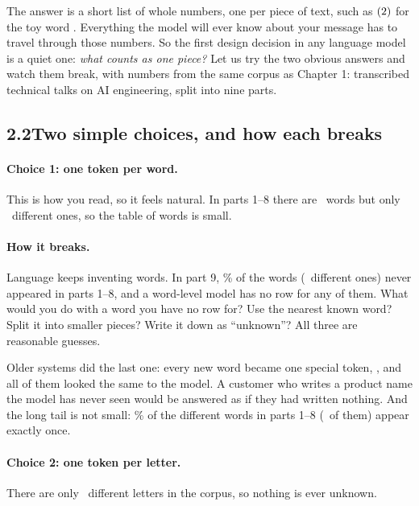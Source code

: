 The answer is a short list of whole numbers, one per piece of text, such as $(2)$ for the
toy word . Everything the model will ever know about your message has to travel through those
numbers. So the first design decision in any language model is a quiet one: \emph{what counts as one
piece?} Let us try the two obvious answers and watch them break, with numbers from the same corpus as
Chapter 1: transcribed technical talks on AI engineering, split into nine parts.


\subsection*{2.2\quad Two simple choices, and how each breaks}

\paragraph{Choice 1: one token per word.} This is how you read, so it feels natural. In parts 1--8 there
are \cTrainWords\ words but only \nTwoWordVocab\ different ones, so the table of words is small.

\paragraph{How it breaks.} Language keeps inventing words. In part 9, \nTwoUnseenWordPct\% of the
words (\nTwoUnseenTypes\ different ones) never appeared in parts 1--8, and a word-level model has no
row for any of them. What would you do with a word you have no row for? Use the nearest known word? Split it
into smaller pieces? Write it down as ``unknown''? All three are reasonable guesses.

Older systems did the last one: every new word became one special token, , and all of them
looked the same to the model. A customer who writes a product name the model has never seen would be
answered as if they had written nothing. And the long tail is not small: \nTwoSingletonPct\% of the
different words in parts 1--8 (\nTwoSingletons\ of them) appear exactly once.

\paragraph{Choice 2: one token per letter.} There are only \nTwoChars\ different letters in the
corpus, so nothing is ever unknown.

